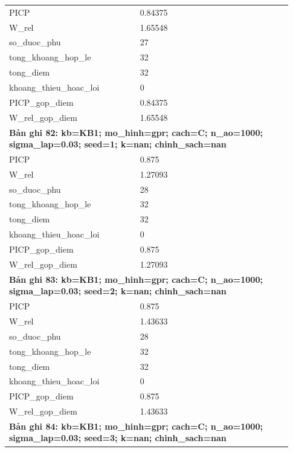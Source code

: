 \begin{longtable}{p{0.43\linewidth}p{0.50\linewidth}}
PICP & 0.84375 \\
W\_\allowbreak rel & 1.65548 \\
so\_\allowbreak duoc\_\allowbreak phu & 27 \\
tong\_\allowbreak khoang\_\allowbreak hop\_\allowbreak le & 32 \\
tong\_\allowbreak diem & 32 \\
khoang\_\allowbreak thieu\_\allowbreak hoac\_\allowbreak loi & 0 \\
PICP\_\allowbreak gop\_\allowbreak diem & 0.84375 \\
W\_\allowbreak rel\_\allowbreak gop\_\allowbreak diem & 1.65548 \\
\midrule
\multicolumn{2}{p{0.95\linewidth}}{\textbf{Bản ghi 82: kb=KB1; mo\_hinh=gpr; cach=C; n\_ao=1000; sigma\_lap=0.03; seed=1; k=nan; chinh\_sach=nan}} \\
PICP & 0.875 \\
W\_\allowbreak rel & 1.27093 \\
so\_\allowbreak duoc\_\allowbreak phu & 28 \\
tong\_\allowbreak khoang\_\allowbreak hop\_\allowbreak le & 32 \\
tong\_\allowbreak diem & 32 \\
khoang\_\allowbreak thieu\_\allowbreak hoac\_\allowbreak loi & 0 \\
PICP\_\allowbreak gop\_\allowbreak diem & 0.875 \\
W\_\allowbreak rel\_\allowbreak gop\_\allowbreak diem & 1.27093 \\
\midrule
\multicolumn{2}{p{0.95\linewidth}}{\textbf{Bản ghi 83: kb=KB1; mo\_hinh=gpr; cach=C; n\_ao=1000; sigma\_lap=0.03; seed=2; k=nan; chinh\_sach=nan}} \\
PICP & 0.875 \\
W\_\allowbreak rel & 1.43633 \\
so\_\allowbreak duoc\_\allowbreak phu & 28 \\
tong\_\allowbreak khoang\_\allowbreak hop\_\allowbreak le & 32 \\
tong\_\allowbreak diem & 32 \\
khoang\_\allowbreak thieu\_\allowbreak hoac\_\allowbreak loi & 0 \\
PICP\_\allowbreak gop\_\allowbreak diem & 0.875 \\
W\_\allowbreak rel\_\allowbreak gop\_\allowbreak diem & 1.43633 \\
\midrule
\multicolumn{2}{p{0.95\linewidth}}{\textbf{Bản ghi 84: kb=KB1; mo\_hinh=gpr; cach=C; n\_ao=1000; sigma\_lap=0.03; seed=3; k=nan; chinh\_sach=nan}} \\

\end{longtable}
